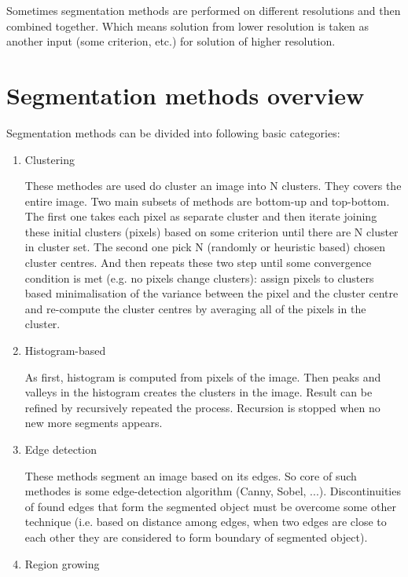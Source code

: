 Sometimes segmentation methods are performed on different resolutions and then combined together.
Which means solution from lower resolution is taken as another input (some criterion, etc.) for solution of higher resolution.

\section{Segmentation methods overview}

Segmentation methods can be divided into following basic categories:

\begin{enumerate}

  \item Clustering

  These methodes are used do cluster an image into N clusters.
They covers the entire image.
Two main subsets of methods are bottom-up and top-bottom.
The first one takes each pixel as separate cluster and then iterate joining these initial clusters (pixels) based on some criterion until there are N cluster in cluster set.
The second one pick N (randomly or heuristic based) chosen cluster centres.
And then repeats these two step until some convergence condition is met (e.g. no pixels change clusters): assign pixels to clusters based minimalisation of the variance between the pixel and the cluster centre and re-compute the cluster centres by averaging all of the pixels in the cluster.

  \item Histogram-based

  As first, histogram is computed from pixels of the image.
Then peaks and valleys in the histogram creates the clusters in the image.
Result can be refined by recursively repeated the process.
Recursion is stopped when no new more segments appears.

  \item Edge detection

  These methods segment an image based on its edges.
So core of such methodes is some edge-detection algorithm (Canny, Sobel, ...).
Discontinuities of found edges that form the segmented object must be overcome some other technique (i.e. based on distance among edges, when two edges are close to each other they are considered to form boundary of segmented object).

  \item Region growing


\end{enumerate}
